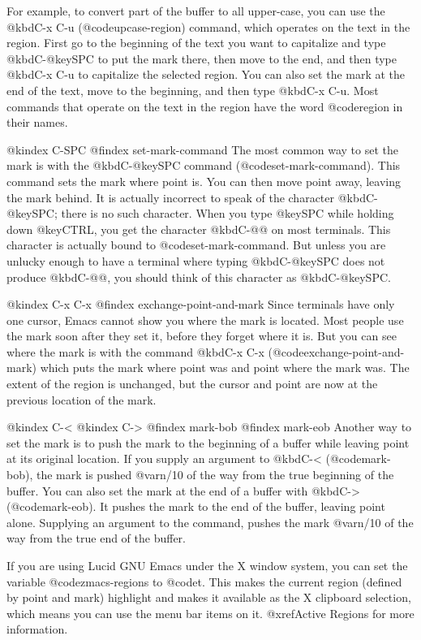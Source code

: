 {{  For example, to convert part of the buffer to all
upper-case, you can use the @kbd{C-x C-u} (@code{upcase-region})
command, which operates on the text in the region.  First go to the
beginning of the text you want to capitalize and type @kbd{C-@key{SPC}} to
put the mark there, then move to the end, and then type @kbd{C-x C-u} to
capitalize the selected region.  You can also set the mark at the end of the
text, move to the beginning, and then type @kbd{C-x C-u}.  Most commands
that operate on the text in the region have the word @code{region} in
their names.

@kindex C-SPC
@findex set-mark-command
  The most common way to set the mark is with the @kbd{C-@key{SPC}}
command (@code{set-mark-command}).  This command sets the mark where
point is. You can then move point away, leaving the mark behind.  It is
actually incorrect to speak of the character @kbd{C-@key{SPC}}; there is
no such character.  When you type @key{SPC} while holding down
@key{CTRL}, you get the character @kbd{C-@@} on most terminals. This
character is actually bound to @code{set-mark-command}.  But unless you are
unlucky enough to have a terminal where typing @kbd{C-@key{SPC}} does
not produce @kbd{C-@@}, you should think of this character as
@kbd{C-@key{SPC}}.

@kindex C-x C-x
@findex exchange-point-and-mark
  Since terminals have only one cursor, Emacs cannot show you where the
mark is located. Most people use the mark soon after they set it, before
they forget where it is. But you can see where the mark is with the
command @kbd{C-x C-x} (@code{exchange-point-and-mark}) which puts the
mark where point was and point where the mark was.  The extent of the
region is unchanged, but the cursor and point are now at the previous
location of the mark. 

@kindex C-<
@kindex C->
@findex mark-bob
@findex mark-eob
 Another way to set the mark is to push the mark to the beginning of a
buffer while leaving point at its original location. If you supply an
argument to @kbd{C-<} (@code{mark-bob}), the mark is pushed
@var{n}/10 of the way from the true beginning of the buffer. You can
also set the mark at the end of a buffer with @kbd{C->}
(@code{mark-eob}). It pushes the mark to the end of the buffer, leaving
point alone. Supplying an argument to the command, pushes the mark
@var{n}/10 of the way from the true end of the buffer.

If you are using Lucid GNU Emacs under the X window system, you can set
the variable @code{zmacs-regions} to @code{t}. This makes the current
region (defined by point and mark) highlight and makes it available as
the X clipboard selection, which means you can use the menu bar items on
it.  @xref{Active Regions} for more information.
 
}}
